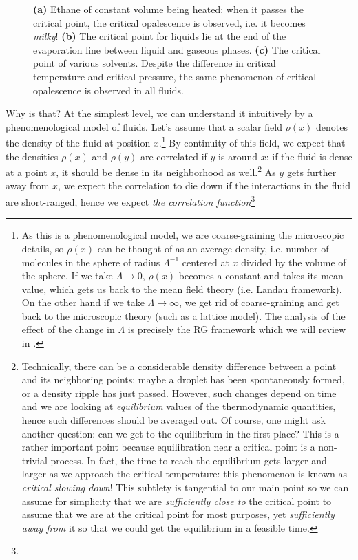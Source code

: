 \documentclass[12pt]{article}
\numberwithin{equation}{section}
\begin{document}
\begin{figure}
\begin{gather*}
\begin{aligned}
		\end{aligned}
	\end{gather*}
	\caption[Critical opalescense]{\label{fig: critical opalescense}
		\textbf{(a)} Ethane of constant volume being heated: when it passes the critical point, the critical opalescence is observed, i.e. it becomes \emph{milky}! \textbf{(b)} The critical point for liquids lie at the end of the evaporation line between liquid and gaseous phases. \textbf{(c)} The critical point of various solvents. Despite the difference in critical temperature and critical pressure, the same phenomenon of critical opalescence is observed in all fluids.
	}
\end{figure}

Why is that? At the simplest level, we can understand it intuitively by a phenomenological model of fluids. Let's assume that a scalar field $\rho(x)$ denotes the density of the fluid at position $x$.\footnote{As this is a phenomenological model, we are coarse-graining the microscopic details, so $\rho(x)$ can be thought of as an average density, i.e. number of molecules in the sphere of radius $\Lambda^{-1}$ centered at $x$ divided by the volume of the sphere. If we take $\Lambda\rightarrow0$, $\rho(x)$ becomes a constant and takes its mean value, which gets us back to the mean field theory (i.e. Landau framework). On the other hand if we take $\Lambda\rightarrow\infty$, we get rid of coarse-graining and get back to the microscopic theory (such as a lattice model). The analysis of the effect of the change in $\Lambda$ is precisely the RG framework which we will review in \secref{\ref{sec: review of RG}}.} By continuity of this field, we expect that the densities $\rho(x)$ and $\rho(y)$ are correlated if $y$ is around $x$: if the fluid is dense at a point $x$, it should be dense in its neighborhood as well.\footnote{Technically, there can be a considerable density difference between a point and its neighboring points: maybe a droplet has been spontaneously formed, or a density ripple has just passed. However, such changes depend on time and we are looking at \emph{equilibrium} values of the thermodynamic quantities, hence such differences should be averaged out. Of course, one might ask another question: can we get to the equilibrium in the first place? This is a rather important point because equilibration near a critical point is a non-trivial process.  In fact, the time to reach the equilibrium gets larger and larger as we approach the critical temperature: this phenomenon is known as \emph{critical slowing down}! This subtlety is tangential to our main point so we can assume for simplicity that we are \emph{sufficiently close to} the critical point to assume that we are at the critical point for most purposes, yet \emph{sufficiently away from} it so that we could get the equilibrium in a feasible time.} As $y$ gets further away from $x$, we expect the correlation to die down if the interactions in the fluid are short-ranged, hence we expect \emph{the correlation function}\footnote{
}
\end{document}

